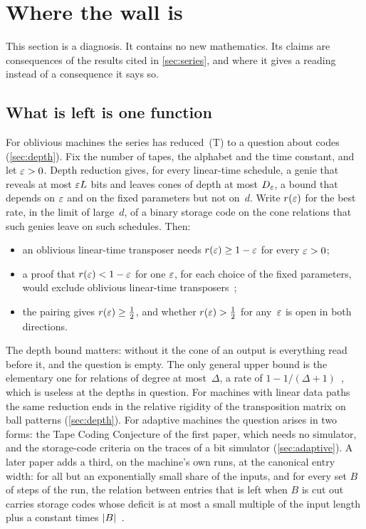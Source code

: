\section{Where the wall is}\label{sec:wall}

This section is a diagnosis. It contains no new mathematics. Its claims are consequences of the results cited in
\cref{sec:series}, and where it gives a reading instead of a consequence it says so.

\subsection{What is left is one function}\label{sec:one-function}

For oblivious machines the series has reduced~(T) to a question about codes (\cref{sec:depth}). Fix the number of
tapes, the alphabet and the time constant, and let $\varepsilon>0$. Depth reduction gives, for every linear-time schedule, a
genie that reveals at most $\varepsilon L$ bits and leaves cones of depth at most $D_\varepsilon$, a bound that depends on $\varepsilon$ and
on the fixed parameters but not on~$d$. Write $r(\varepsilon)$ for the best rate, in the limit of large~$d$, of a binary
storage code on the cone relations that such genies leave on such schedules. Then:
\begin{itemize}[leftmargin=1.5em]
\item an oblivious linear-time transposer needs $r(\varepsilon)\ge1-\varepsilon$ for every $\varepsilon>0$;
\item a proof that $r(\varepsilon)<1-\varepsilon$ for one $\varepsilon$, for each choice of the fixed parameters, would exclude oblivious
linear-time transposers~\cite[Corollary~9.3]{BoundedStack2026};
\item the pairing gives $r(\varepsilon)\ge\tfrac12$, and whether $r(\varepsilon)>\tfrac12$ for any~$\varepsilon$ is open in both directions.
\end{itemize}
The depth bound matters: without it the cone of an output is everything read before it, and the question is empty.
The only general upper bound is the elementary one for relations of degree at most~$\Delta$, a rate of
$1-1/(\Delta+1)$~\cite[Proposition~4.14]{FourthPaper2026}, which is useless at the depths in question. For machines with linear data paths the same reduction
ends in the relative rigidity of the transposition matrix on ball patterns (\cref{sec:depth}). For adaptive machines
the question arises in two forms: the Tape Coding Conjecture of the first paper, which needs no simulator, and
the storage-code criteria on the traces of a bit simulator (\cref{sec:adaptive}). A later paper adds a third, on the
machine's own runs, at the canonical entry width: for all but an exponentially small share of the inputs, and for
every set $B$ of steps of the run, the relation between entries that is left when $B$ is cut out carries storage
codes whose deficit is at most a small multiple of the input length plus a constant times
$\lvert B \rvert$~\cite[Theorem~H.5 and Corollary~H.6]{AdaptiveTransfer2026}.

